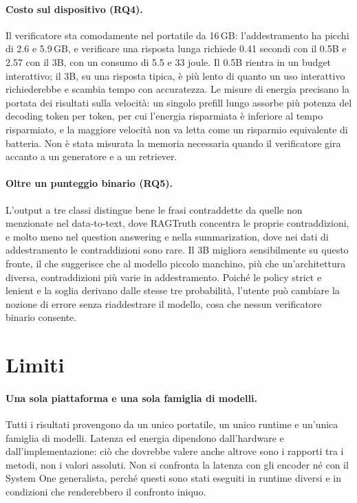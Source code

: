\paragraph{Costo sul dispositivo (RQ4).} Il verificatore sta comodamente nel portatile da 16\,GB: l'addestramento ha
picchi di 2.6 e 5.9\,GB, e verificare una risposta lunga richiede 0.41 secondi con il 0.5B e 2.57 con il 3B, con un
consumo di 5.5 e 33 joule. Il 0.5B rientra in un budget interattivo; il 3B, su una risposta tipica, è più lento di quanto
un uso interattivo richiederebbe e scambia tempo con accuratezza. Le misure di energia precisano la portata dei risultati
sulla velocità: un singolo prefill lungo assorbe più potenza del decoding token per token, per cui l'energia risparmiata
è inferiore al tempo risparmiato, e la maggiore velocità non va letta come un risparmio equivalente di batteria. Non è
stata misurata la memoria necessaria quando il verificatore gira accanto a un generatore e a un retriever.

\paragraph{Oltre un punteggio binario (RQ5).} L'output a tre classi distingue bene le frasi contraddette da quelle non
menzionate nel data-to-text, dove RAGTruth concentra le proprie contraddizioni, e molto meno nel question answering e nella
summarization, dove nei dati di addestramento le contraddizioni sono rare. Il 3B migliora sensibilmente su questo fronte,
il che suggerisce che al modello piccolo manchino, più che un'architettura diversa, contraddizioni più varie in
addestramento. Poiché le policy strict e lenient e la soglia derivano dalle stesse tre probabilità, l'utente può
cambiare la nozione di errore senza riaddestrare il modello, cosa che nessun verificatore binario consente.

\section{Limiti}
\label{sec:disc-limitations}

\paragraph{Una sola piattaforma e una sola famiglia di modelli.} Tutti i risultati provengono da un unico portatile, un
unico runtime e un'unica famiglia di modelli. Latenza ed energia dipendono dall'hardware e dall'implementazione: ciò che
dovrebbe valere anche altrove sono i rapporti tra i metodi, non i valori assoluti. Non si confronta la latenza con gli
encoder né con il System One generalista, perché questi sono stati eseguiti in runtime diversi e in condizioni che
renderebbero il confronto iniquo.

